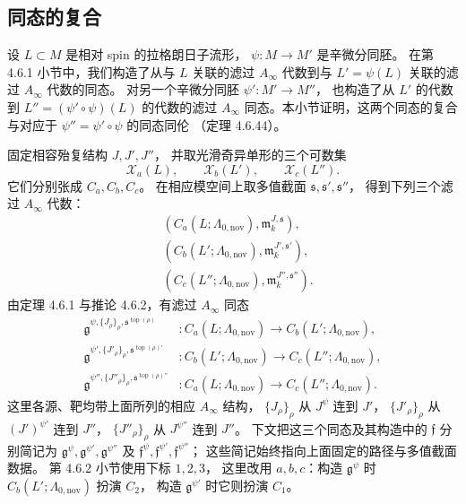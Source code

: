 
\subsection{同态的复合}
\label{subsec:4-6-3}

设 $L\subset M$ 是相对 spin 的拉格朗日子流形，
$\psi\colon M\to M'$ 是辛微分同胚。
在第 4.6.1 小节中，我们构造了从与 $L$ 关联的滤过
$A_\infty$ 代数到与 $L'=\psi(L)$ 关联的滤过
$A_\infty$ 代数的同态。
对另一个辛微分同胚 $\psi'\colon M'\to M''$，
也构造了从 $L'$ 的代数到
$L''=(\psi'\circ\psi)(L)$ 的代数的滤过
$A_\infty$ 同态。本小节证明，这两个同态的复合
与对应于 $\psi''=\psi'\circ\psi$ 的同态同伦
（定理 4.6.44）。

固定相容殆复结构 $J,J',J''$，
并取光滑奇异单形的三个可数集
\[
\mathcal X_a(L),\qquad
\mathcal X_b(L'),\qquad
\mathcal X_c(L'').
\]
它们分别张成 $C_a,C_b,C_c$。
在相应模空间上取多值截面
$\mathfrak s,\mathfrak s',\mathfrak s''$，
得到下列三个滤过 $A_\infty$ 代数：
\[
\begin{aligned}
&(C_a(L;\Lambda_{0,\mathrm{nov}}),\mathfrak m_k^{J,\mathfrak s}),\\
&(C_b(L';\Lambda_{0,\mathrm{nov}}),\mathfrak m_k^{J',\mathfrak s'}),\\
&(C_c(L'';\Lambda_{0,\mathrm{nov}}),\mathfrak m_k^{J'',\mathfrak s''}).
\end{aligned}
\]
由定理 4.6.1 与推论 4.6.2，有滤过 $A_\infty$ 同态
\[
\begin{aligned}
\mathfrak g^{\psi,\{J_\rho\}_\rho,
\mathfrak s^{\operatorname{top}(\rho)}}
&\colon C_a(L;\Lambda_{0,\mathrm{nov}})
 \longrightarrow C_b(L';\Lambda_{0,\mathrm{nov}}),\\
\mathfrak g^{\psi',\{J'_\rho\}_\rho,
\mathfrak s^{\operatorname{top}(\rho)'}}
&\colon C_b(L';\Lambda_{0,\mathrm{nov}})
 \longrightarrow C_c(L'';\Lambda_{0,\mathrm{nov}}),\\
\mathfrak g^{\psi'',\{J''_\rho\}_\rho,
\mathfrak s^{\operatorname{top}(\rho)''}}
&\colon C_a(L;\Lambda_{0,\mathrm{nov}})
 \longrightarrow C_c(L'';\Lambda_{0,\mathrm{nov}}).
\end{aligned}
\]
这里各源、靶均带上面所列的相应 $A_\infty$ 结构，
$\{J_\rho\}_\rho$ 从 $J^\psi$ 连到 $J'$，
$\{J'_\rho\}_\rho$ 从 $(J')^{\psi'}$ 连到 $J''$，
$\{J''_\rho\}_\rho$ 从 $J^{\psi''}$ 连到 $J''$。
下文把这三个同态及其构造中的
$\mathfrak f$ 分别简记为
$\mathfrak g^\psi,\mathfrak g^{\psi'},\mathfrak g^{\psi''}$
及 $\mathfrak f^\psi,\mathfrak f^{\psi'},\mathfrak f^{\psi''}$；
这些简记始终指向上面固定的路径与多值截面数据。
第 4.6.2 小节使用下标 $1,2,3$，
这里改用 $a,b,c$：构造 $\mathfrak g^\psi$ 时
$C_b(L';\Lambda_{0,\mathrm{nov}})$ 扮演 $C_2$，
构造 $\mathfrak g^{\psi'}$ 时它则扮演 $C_1$。

